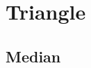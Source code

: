 \documentclass[11pt]{book}
\begin{document}
\frontmatter


\subtitle{Through Algebra}


\titlepage

\tableofcontents

\setcounter{page}{0}

\mainmatter

\chapter{Triangle}

\section{Median}
\end{document}
